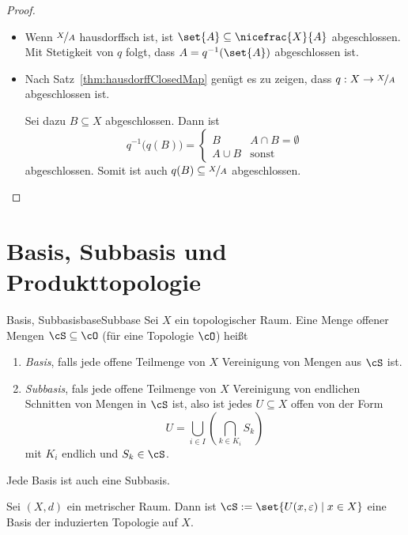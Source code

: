 \documentclass[language=ngerman]{TemplateLecture} %
\begin{document}
\begin{proof}
    \begin{itemize}
        \item[\enquote{$\Rightarrow$}:] Wenn $\nicefrac{X}{A}$ hausdorffsch ist, ist $\set{A} \subseteq \nicefrac{X}{A}$ abgeschlossen. Mit Stetigkeit von $q$ folgt, dass $A = q^{-1}(\set{A})$ abgeschlossen ist.
        \item[\enquote{$\Leftarrow$}:] Nach Satz~\ref{thm:hausdorffClosedMap} genügt es zu zeigen, dass $q: X \to \nicefrac{X}{A}$ abgeschlossen ist.
        
        Sei dazu $B \subseteq X$ abgeschlossen. Dann ist
        \begin{equation*}
            q^{-1}\bigl(q(B)\bigr) = \begin{cases}
                B & A \cap B = \emptyset \\
                A \cup B & \text{sonst}
            \end{cases}
        \end{equation*}
        abgeschlossen. Somit ist auch $q(B) \subseteq \nicefrac{X}{A}$ abgeschlossen.
    \end{itemize}
\end{proof}


\chapter{Basis, Subbasis und Produkttopologie}

\begin{defi}{Basis, Subbasis}{baseSubbase}
    Sei $X$ ein topologischer Raum. Eine Menge offener Mengen $\cS \subseteq \cO$ (für eine Topologie $\cO$) heißt 
    \begin{enumerate}[$(i)$]
        \item \emph{Basis}, falls jede offene Teilmenge von $X$ Vereinigung von Mengen aus $\cS$ ist.
        \item \emph{Subbasis}, fals jede offene Teilmenge von $X$ Vereinigung von endlichen Schnitten von Mengen in $\cS$ ist, also ist jedes $U \subseteq X$ offen von der Form 
        \begin{equation*}
            U = \bigcup_{i \in I} \left(\bigcap_{k \in K_i} S_k\right)
        \end{equation*}
        mit $K_i$ endlich und $S_k \in \cS$.
    \end{enumerate}
\end{defi}
\begin{remark}
    Jede Basis ist auch eine Subbasis.
\end{remark}
\begin{example}
    Sei $(X,d)$ ein metrischer Raum. Dann ist $\cS := \set{U(x, \varepsilon) \mid x \in X}$ eine Basis der induzierten Topologie auf $X$.
\end{example}
\end{document}
